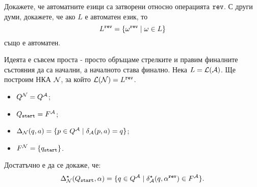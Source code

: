 \begin{problem}
  Докажете, че автоматните езици са затворени относно операцията $\texttt{rev}$.
  С други думи, докажете, че ако $L$ е автоматен език, то
  \[L^{\texttt{rev}} = \{\omega^{\texttt{rev}} \mid \omega \in L\}\]
  също е автоматен.
\end{problem}
\begin{hint}
  Идеята е съвсем проста - просто обръщаме стрелките и правим финалните състояния да са начални, а началното става финално.
  Нека $L = \mathcal{L}(\mathcal{A})$. Ще построим НКА $\mathcal{N}$, за който $\mathcal{L}(\mathcal{N}) = L^{\texttt{rev}}$.
  \begin{itemize}
  \item
    $Q^{\mathcal{N}} = Q^{\mathcal{A}}$;
  \item
    $Q_{\texttt{start}} = F^{\mathcal{A}}$;
  \item
    $\Delta_{\mathcal{N}}(q,a) = \{p \in Q^{\mathcal{A}} \mid \delta_{\mathcal{A}}(p,a) = q\}$;
  \item
    $F^{\mathcal{N}} = \{q_{\texttt{start}}\}$.
  \end{itemize}
  Достатъчно е да се докаже, че:
  \[\Delta^\star_{\mathcal{N}}(Q_{\texttt{start}},\alpha) = \{ q \in Q^{\mathcal{A}} \mid \delta^\star_{\mathcal{A}}(q,\alpha^{\texttt{rev}}) \in F^{\mathcal{A}}\}.\]
\end{hint}

